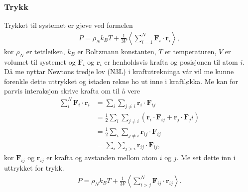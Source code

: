 \documentclass[12pt, a4paper]{article}
\theoremstyle{definition} \newtheorem*{definition}{Teorem}
\newcommand{\vb}{\mathbf}
\begin{document}
        \subsubsection*{Trykk}
            Trykket til systemet er gjeve ved formelen 
            \begin{align*}
                P = \rho_Nk_BT + \frac{1}{3V}\left \langle \sum_{i = 1}^N \vb{F}_{i}\cdot\vb{r}_{i} \right \rangle,
            \end{align*}
            kor $\rho_N$ er tettleiken, $k_B$ er Boltzmann konstanten, $T$ er temperaturen, $V$ er volumet til systemet og $\vb{F}_i$ og $\vb{r}_i$ er henholdsvis krafta
            og posisjonen til atom $i$. Då me nyttar Newtons tredje lov (N3L) i kraftutrekninga vår vil me kunne forenkle dette uttrykket og istaden rekne ho ut inne i kraftløkka.
            Me kan for parvis interaksjon skrive krafta om til å vere
            \begin{align*}
                \sum_i^N \vb{F}_i\cdot\vb{r}_i &= \sum_i\sum_{j\neq i}\vb{r}_i\cdot \vb{F}_{ij} \\
                &= \frac{1}{2}\sum_i\sum_{j\neq i }\left( \vb{r}_i\cdot\vb{F}_{ij} + \vb{r}_j\cdot\vb{F}_ji \right) \\
                &= \frac{1}{2}\sum_i\sum_{j\neq i} \vb{r}_{ij}\cdot\vb{F}_{ij} \\
                &= \sum_i\sum_{j > i}\vb{r}_{ij}\cdot\vb{F}_{ij},
            \end{align*}
            kor $\vb{F}_{ij}$ og $\vb{r}_{ij}$ er krafta og avstanden mellom atom $i$ og $j$. Me set dette inn i uttrykket for trykk.
            \begin{align*}
                P = \rho_Nk_BT + \frac{1}{3V}\left \langle \sum_{i > j}^N \vb{F}_{ij}\cdot\vb{r}_{ij} \right \rangle.
            \end{align*}
\end{document}
